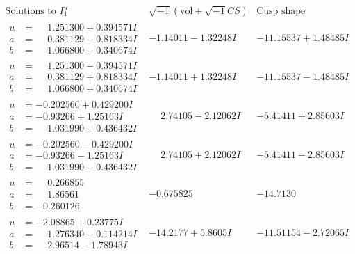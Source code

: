 \documentclass[1p]{elsarticle_modified}
\theoremstyle{definition}
\newcommand{\I}{\sqrt{-1}}
\begin{document}
$$\begin{array}{c|c|c}  
\text{Solutions to }I^u_{1}& \I (\text{vol} + \sqrt{-1}CS) & \text{Cusp shape}\\
 \hline 
\begin{aligned}
u &= \phantom{-}1.251300 + 0.394571 I \\
a &= \phantom{-}0.381129 - 0.818334 I \\
b &= \phantom{-}1.066800 - 0.340674 I\end{aligned}
 & -1.14011 - 1.32248 I & -11.15537 + 1.48485 I \\ \hline\begin{aligned}
u &= \phantom{-}1.251300 - 0.394571 I \\
a &= \phantom{-}0.381129 + 0.818334 I \\
b &= \phantom{-}1.066800 + 0.340674 I\end{aligned}
 & -1.14011 + 1.32248 I & -11.15537 - 1.48485 I \\ \hline\begin{aligned}
u &= -0.202560 + 0.429200 I \\
a &= -0.93266 + 1.25163 I \\
b &= \phantom{-}1.031990 + 0.436432 I\end{aligned}
 & \phantom{-}2.74105 - 2.12062 I & -5.41411 + 2.85603 I \\ \hline\begin{aligned}
u &= -0.202560 - 0.429200 I \\
a &= -0.93266 - 1.25163 I \\
b &= \phantom{-}1.031990 - 0.436432 I\end{aligned}
 & \phantom{-}2.74105 + 2.12062 I & -5.41411 - 2.85603 I \\ \hline\begin{aligned}
u &= \phantom{-}0.266855\phantom{ +0.000000I} \\
a &= \phantom{-}1.86561\phantom{ +0.000000I} \\
b &= -0.260126\phantom{ +0.000000I}\end{aligned}
 & -0.675825\phantom{ +0.000000I} & -14.7130\phantom{ +0.000000I} \\ \hline\begin{aligned}
u &= -2.08865 + 0.23775 I \\
a &= \phantom{-}1.276340 - 0.114214 I \\
b &= \phantom{-}2.96514 - 1.78943 I\end{aligned}
 & -14.2177 + 5.8605 I & -11.51154 - 2.72065 I \\ \hline\begin{aligned}

\end{aligned}
\end{array}$$
\end{document}
